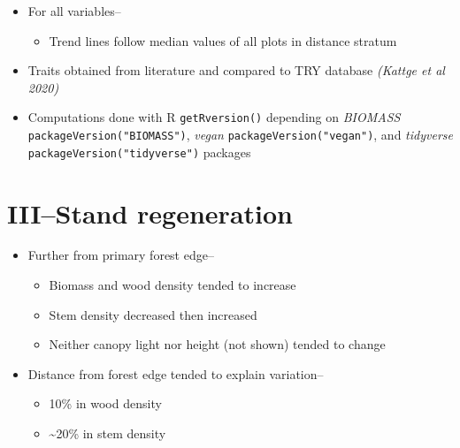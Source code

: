 \documentclass[
]{article}
\providecommand{\tightlist}{%
  \setlength{\itemsep}{0pt}\setlength{\parskip}{0pt}}
\begin{document}
\begin{itemize}
\item
  For all variables--

  \begin{itemize}
  \tightlist
  \item
    Trend lines follow median values of all plots in distance stratum
  \end{itemize}
\item
  Traits obtained from literature and compared to TRY database
  \emph{(Kattge et al 2020)}
\item
  Computations done with R \texttt{getRversion()} depending on
  \emph{BIOMASS} \texttt{packageVersion("BIOMASS")}, \emph{vegan}
  \texttt{packageVersion("vegan")}, and \emph{tidyverse}
  \texttt{packageVersion("tidyverse")} packages
\end{itemize}

\hypertarget{iiistand-regeneration}{%
\section{III--Stand regeneration}\label{iiistand-regeneration}}

\begin{itemize}
\item
  Further from primary forest edge--

  \begin{itemize}
  \item
    Biomass and wood density tended to increase
  \item
    Stem density decreased then increased
  \item
    Neither canopy light nor height (not shown) tended to change
  \end{itemize}
\item
  Distance from forest edge tended to explain variation--

  \begin{itemize}
  \item
    10\% in wood density
  \item
    \textasciitilde20\% in stem density
  \end{itemize}
\end{itemize}
\end{document}
